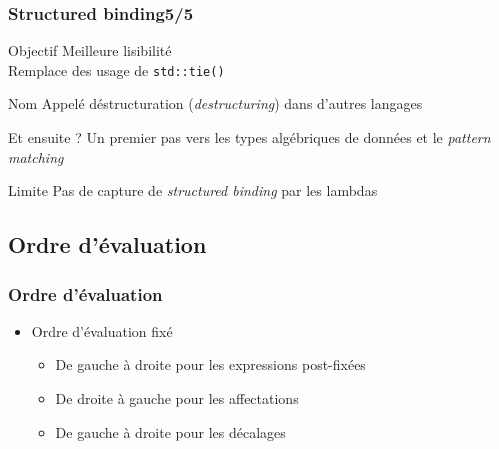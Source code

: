 \documentclass[C++.tex]{subfiles}
\begin{document}
\begin{frame}[fragile]
	\frametitle{Structured binding\titlehfill{}5/5}
	\begin{block}{Objectif}
		Meilleure lisibilité\\
		Remplace des usage de \lstinline|std::tie()|
	\end{block}

	\begin{block}{Nom}
		Appelé déstructuration (\textit{destructuring}) dans d'autres langages
	\end{block}

	\begin{block}{Et ensuite ?}
		Un premier pas vers les types algébriques de données et le \textit{pattern matching}
	\end{block}


	\begin{alertblock}{Limite}
		Pas de capture de \textit{structured binding} par les lambdas
	\end{alertblock}


\end{frame}

\subsection*{Ordre d'évaluation}
\begin{frame}[fragile]
	\frametitle{Ordre d'évaluation}
	\begin{itemize}
		\item Ordre d'évaluation fixé
		\begin{itemize}
			\item De gauche à droite pour les expressions post-fixées


			\item De droite à gauche pour les affectations
			\item De gauche à droite pour les décalages
		\end{itemize}
	\end{itemize}
\end{frame}
\end{document}
